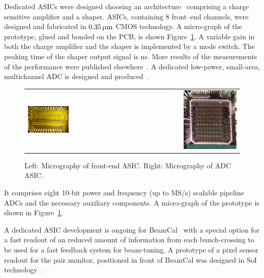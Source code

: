 Dedicated ASICs were designed choosing
an
architecture~\cite{Boie1982365,Gatti:1986qq}
comprising a charge sensitive amplifier and a shaper.
ASICs, containing 8 front--end channels, were designed and fabricated in $\unit[0.35]{\micron}$ CMOS technology.
A micro-graph of the prototype, glued and bonded on the PCB, is shown Figure~\ref{fig:frontend_photo}.
A variable gain in both the charge amplifier and
the shaper is implemented by a mode switch. The peaking time of the shaper output signal is \unit[60]{ns}.
More results of the measurements of the performance were published elsewhere~\cite{4600902}.
A dedicated low-power, small-area, multichannel ADC is designed and produced~\cite{6156491}.
\begin{figure}[hbp]
\begin{center}
 \begin{tabular}{rrr}
    \includegraphics[width=0.4\columnwidth]{Calorimeter/FCAL/figs/fcal_lumical_fe_photo}
     &~~~~~~&
 \includegraphics[width=0.4\textwidth,height=0.28\textwidth]{Calorimeter/FCAL/figs/adc_asic_photo.png} \\

\end{tabular}
   \end{center}
          \caption{Left: Micrography of front-end ASIC.
               Right: Micrography of ADC ASIC.}
    \label{fig:frontend_photo}
\end{figure}
It comprises eight 10-bit power and frequency (up to \unit[24]{MS/s}) scalable pipeline ADCs and the necessary
auxiliary components.
A micro-graph of the prototype is shown in Figure~\ref{fig:frontend_photo}.

A dedicated ASIC development is ongoing for BeamCal~\cite{6200898}
with a special option for a fast readout of an reduced amount of
information from each bunch-crossing to be used for a fast feedback system for beam-tuning.
A prototype of a pixel sensor readout for the pair monitor, positioned in front of BeamCal was designed in SoI
technology~\cite{Sato201153}.

